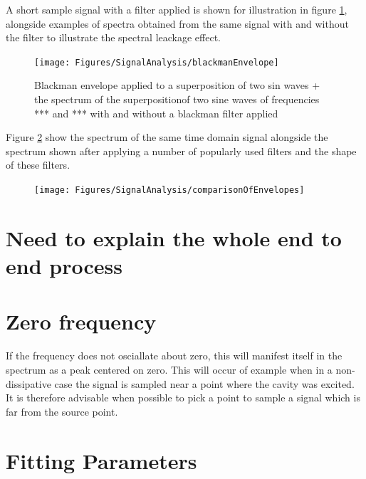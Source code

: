 A short sample signal with a filter applied is shown for illustration in figure
\ref{fig:signal-analysis-blackman-envelope}, alongside examples of spectra
obtained from the same signal with and without the filter to illustrate the
spectral leackage effect.

\begin{figure}
\begin{center}
    \texttt{[image: Figures/SignalAnalysis/blackmanEnvelope]}
\end{center}
\caption{Blackman envelope applied to a superposition of two sin waves + the
spectrum of the superpositionof two sine waves of frequencies *** and *** with
and without a blackman filter applied }
\label{fig:signal-analysis-blackman-envelope}
\end{figure}

Figure \ref{fig:signal-analysis-comparison-of-envelopes} show the spectrum of
the same time domain signal alongside the spectrum shown after applying a number
of popularly used filters and the shape of these filters.

\begin{figure}
\begin{center}
    \texttt{[image: Figures/SignalAnalysis/comparisonOfEnvelopes]}
\end{center}
\caption{}
\label{fig:signal-analysis-comparison-of-envelopes}
\end{figure}

\section{Need to explain the whole end to end process}

\section{Zero frequency} If the frequency does not osciallate about zero, this
will manifest itself in the spectrum as a peak centered on zero. This will occur
of example when in a non-dissipative case the signal is sampled near a point
where the cavity was excited. It is therefore advisable when possible to pick a
point to sample a signal which is far from the source point.

\section{Fitting Parameters}

